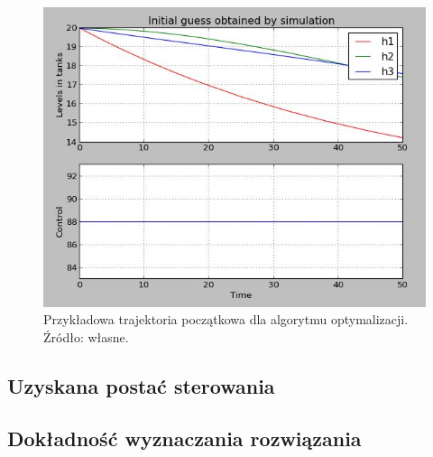 \begin{figure}[tph]
    \centering
    \includegraphics[scale=0.9]{Grafika/initial_guess}
    \caption{Przykładowa trajektoria początkowa dla algorytmu optymalizacji. Źródło: własne.}
    \label{fig:initialguess}
\end{figure}


\subsection{Uzyskana postać sterowania}
\label{sub:opt-ctrl-form}


\subsection{Dokładność wyznaczania rozwiązania}
\label{sub:opt-dokladnosc}

